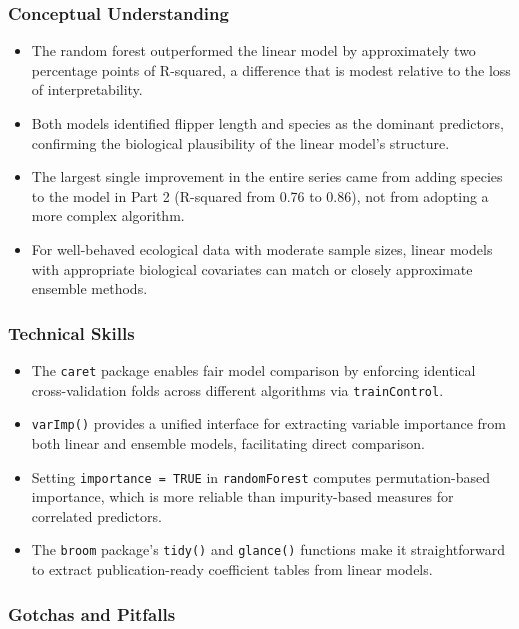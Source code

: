 \documentclass[
  letterpaper,
  DIV=11,
  numbers=noendperiod]{scrartcl}
\providecommand{\tightlist}{%
  \setlength{\itemsep}{0pt}\setlength{\parskip}{0pt}}
\begin{document}
\subsubsection{Conceptual Understanding}\label{conceptual-understanding}

\begin{itemize}
\tightlist
\item
  The random forest outperformed the linear model by approximately two
  percentage points of R-squared, a difference that is modest relative
  to the loss of interpretability.
\item
  Both models identified flipper length and species as the dominant
  predictors, confirming the biological plausibility of the linear
  model's structure.
\item
  The largest single improvement in the entire series came from adding
  species to the model in Part 2 (R-squared from 0.76 to 0.86), not from
  adopting a more complex algorithm.
\item
  For well-behaved ecological data with moderate sample sizes, linear
  models with appropriate biological covariates can match or closely
  approximate ensemble methods.
\end{itemize}

\subsubsection{Technical Skills}\label{technical-skills}

\begin{itemize}
\tightlist
\item
  The \texttt{caret} package enables fair model comparison by enforcing
  identical cross-validation folds across different algorithms via
  \texttt{trainControl}.
\item
  \texttt{varImp()} provides a unified interface for extracting variable
  importance from both linear and ensemble models, facilitating direct
  comparison.
\item
  Setting \texttt{importance\ =\ TRUE} in \texttt{randomForest} computes
  permutation-based importance, which is more reliable than
  impurity-based measures for correlated predictors.
\item
  The \texttt{broom} package's \texttt{tidy()} and \texttt{glance()}
  functions make it straightforward to extract publication-ready
  coefficient tables from linear models.
\end{itemize}

\subsubsection{Gotchas and Pitfalls}\label{gotchas-and-pitfalls}
\end{document}

